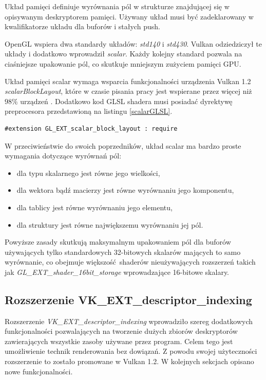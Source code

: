 Układ pamięci definiuje wyrównania pól w strukturze znajdującej się w opisywanym deskryptorem pamięci.
Używany układ musi być zadeklarowany w kwalifikatorze układu dla buforów i stałych push.

OpenGL wspiera dwa standardy układów: \textit{std140} i \textit{std430}.
Vulkan odziedziczył te układy i dodatkowo wprowadził \textit{scalar}.
Każdy kolejny standard pozwala na ciaśniejsze upakowanie pól, co skutkuje mniejszym zużyciem pamięci GPU.

Układ pamięci scalar wymaga wsparcia funkcjonalności urządzenia Vulkan 1.2 \textit{scalarBlockLayout}, które w czasie pisania pracy jest wspierane przez więcej niż $98\%$ urządzeń \cite{GPUINFO}.
Dodatkowo kod GLSL shadera musi posiadać dyrektywę preprocesora przedstawioną na listingu \ref{scalarGLSL}.
\lstset{language=GLSL}
\begin{lstlisting}[caption={Dyrektywa preprocesora dla układu pamięci skalar},captionpos=b, label={scalarGLSL}]
#extension GL_EXT_scalar_block_layout : require
\end{lstlisting}

W przeciwieństwie do swoich poprzedników, układ scalar ma bardzo proste wymagania dotyczące wyrównań pól:
\begin{itemize}
	\item dla typu skalarnego jest równe jego wielkości,
	\item dla wektora bądź macierzy jest równe wyrównaniu jego komponentu,
	\item dla tablicy jest równe wyrównaniu jego elementu,
	\item dla struktury jest równe największemu wyrównaniu jej pól.
\end{itemize}
Powyższe zasady skutkują maksymalnym upakowaniem pól dla buforów używających tylko standardowych 32-bitowych skalarów mających to samo wyrównanie, co obejmuje większość shaderów nieużywających rozszerzeń takich jak \textit{GL\_EXT\_shader\_16bit\_storage} wprowadzające 16-bitowe skalary.


\subsection{Rozszerzenie VK\_EXT\_descriptor\_indexing}

Rozszerzenie \textit{VK\_EXT\_descriptor\_indexing} wprowadziło szereg dodatkowych funkcjonalności pozwalających na tworzenie dużych zbiorów
deskryptorów zawierających wszystkie zasoby używane przez program.
Celem tego jest umożliwienie technik renderowania bez dowiązań. Z powodu swojej użyteczności rozszerzenie to zostało promowane w Vulkan 1.2.
W kolejnych sekcjach opisano nowe funkcjonalności.

